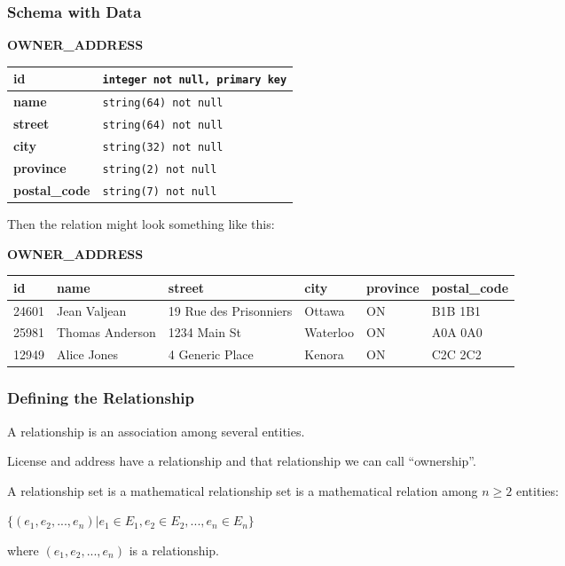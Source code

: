 \begin{frame}
\frametitle{Schema with Data}

\begin{center}
		\textbf{OWNER\_ADDRESS}\\
	\begin{tabular}{|l|l|}\hline
		\textbf{id} & \texttt{integer not null,  primary key}\\ \hline
		\textbf{name} & \texttt{string(64) not null}\\ \hline
		\textbf{street} & \texttt{string(64) not null}\\ \hline
		\textbf{city} & \texttt{string(32) not null}\\ \hline
		\textbf{province} & \texttt{string(2) not null}\\ \hline
		\textbf{postal\_code} & \texttt{string(7) not null}\\ \hline

	\end{tabular}
\end{center}

Then the relation might look something like this:
{\scriptsize
\begin{center}
		\textbf{OWNER\_ADDRESS}\\
	\begin{tabular}{|l|l|l|l|l|l|}\hline
		\textbf{id} & \textbf{name} &\textbf{street} & \textbf{city} & \textbf{province} & \textbf{postal\_code} \\ \hline
		24601 & Jean Valjean & 19 Rue des Prisonniers & Ottawa & ON & B1B 1B1\\ \hline
		25981 & Thomas Anderson & 1234 Main St & Waterloo & ON & A0A 0A0\\ \hline
		12949 & Alice Jones & 4 Generic Place & Kenora & ON & C2C 2C2\\ \hline
	\end{tabular}
\end{center}
}
\end{frame}



\begin{frame}
\frametitle{Defining the Relationship}

A relationship is an association among several entities. 

License and address have a relationship and that relationship we can call ``ownership''.

A relationship set is a mathematical relationship set is a mathematical relation among $n \geq 2$ entities:

\begin{center}
 $\{(e_{1}, e_{2}, ..., e_{n}) | e_{1} \in E_{1}, e_{2} \in E_{2}, ..., e_{n} \in E_{n}\}$
\end{center}

where $(e_{1}, e_{2}, ..., e_{n})$ is a relationship.


\end{frame}



